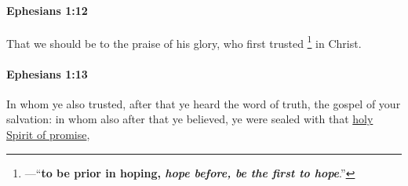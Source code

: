 		\paragraph{Ephesians 1:12} %
			\label{EPHESIANS-1-12}

			That we should be to the praise of his glory, who first trusted%
			\footnote{%
				---``\textbf{to be prior in hoping, \textit{hope before, be the first to hope}}.''
				}
			in Christ.

			\begin{framed}
			\scriptsize
				\begin{compactdesc}
					\item[SBLG] 
				\end{compactdesc}
			\end{framed}

		\paragraph{Ephesians 1:13} %
			\label{EPHESIANS-1-13}

			In whom ye also trusted, after that ye heard the word of truth, the gospel of your salvation: in whom also after that ye believed, ye were sealed with that \hyperref[HSOP]{holy Spirit of promise},

